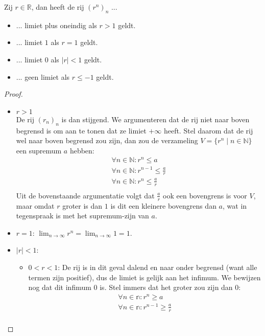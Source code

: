 \documentclass[main.tex]{subfiles}
\begin{document}
\begin{pr}
  Zij $r\in \mathbb{R}$, dan heeft de rij $(r^{n})_{n}$ ...
  \begin{itemize}
  \item ... limiet plus oneindig als $r>1$ geldt.
  \item ... limiet $1$ als $r=1$ geldt.
  \item ... limiet $0$ als $|r|<1$ geldt.
  \item ... geen limiet als $r\le-1$ geldt.
  \end{itemize}

  \begin{proof}
    \begin{itemize}
    \item $r>1$\\
      De rij $(r_{n})_{n}$ is dan stijgend.
      We argumenteren dat de rij niet naar boven begrensd is om aan te tonen dat ze limiet $+\infty$ heeft.
      Stel daarom dat de rij wel naar boven begrensd zou zijn, dan zou de verzameling $V=\{ r^{n}\mid n\in \mathbb{N}\}$ een supremum $a$ hebben:
      \[
      \begin{array}{c}
        \forall n\in \mathbb{N}: r^{n} \le a\\
        \forall n\in \mathbb{N}: r^{n-1} \le \frac{a}{r}\\
        \forall n\in \mathbb{N}: r^{n} \le \frac{a}{r}\\
      \end{array}
      \]
      Uit de bovenstaande argumentatie volgt dat $\frac{a}{r}$ ook een bovengrens is voor $V$, maar omdat $r$ groter is dan $1$ is dit een kleinere bovengrens dan $a$, wat in tegenspraak is met het supremum-zijn van $a$.
    \item $r=1$: $\lim_{n \rightarrow \infty}r^{n}=\lim_{n \rightarrow \infty}1=1$.
    \item $|r|<1$:
      \begin{itemize}
      \item $0<r<1$:
        De rij is in dit geval dalend \needed en naar onder begrensd (want alle termen zijn positief), dus de limiet is gelijk aan het infimum.
        We bewijzen nog dat dit infimum $0$ is.
        Stel immers dat het groter zou zijn dan $0$:
        \[
        \begin{array}{c}
          \forall n\in \mathbb{n}: r^{n} \ge a\\
          \forall n\in \mathbb{n}: r^{n-1} \ge \frac{a}{r}\\

\end{array}\]
\end{itemize}
\end{itemize}
\end{proof}
\end{pr}
\end{document}
